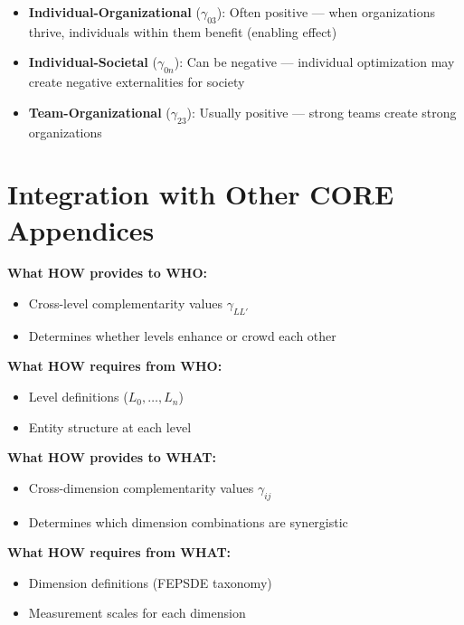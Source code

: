 \begin{itemize}
\item \textbf{Individual-Organizational} ($\gamma_{03}$): Often positive --- when
      organizations thrive, individuals within them benefit (enabling effect)
\item \textbf{Individual-Societal} ($\gamma_{0n}$): Can be negative --- individual
      optimization may create negative externalities for society
\item \textbf{Team-Organizational} ($\gamma_{23}$): Usually positive --- strong
      teams create strong organizations
\end{itemize}


\section{Integration with Other CORE Appendices}
\label{sec:how-integration}

\begin{tcolorbox}[colback=yellow!5!white, colframe=yellow!75!black,
    title=Integration: CORE-HOW $\leftrightarrow$ CORE-WHO]
\textbf{What HOW provides to WHO:}
\begin{itemize}[nosep]
\item Cross-level complementarity values $\gamma_{LL'}$
\item Determines whether levels enhance or crowd each other
\end{itemize}

\textbf{What HOW requires from WHO:}
\begin{itemize}[nosep]
\item Level definitions ($L_0, \ldots, L_n$)
\item Entity structure at each level
\end{itemize}
\end{tcolorbox}

\begin{tcolorbox}[colback=yellow!5!white, colframe=yellow!75!black,
    title=Integration: CORE-HOW $\leftrightarrow$ CORE-WHAT]
\textbf{What HOW provides to WHAT:}
\begin{itemize}[nosep]
\item Cross-dimension complementarity values $\gamma_{ij}$
\item Determines which dimension combinations are synergistic
\end{itemize}

\textbf{What HOW requires from WHAT:}
\begin{itemize}[nosep]
\item Dimension definitions (FEPSDE taxonomy)
\item Measurement scales for each dimension
\end{itemize}
\end{tcolorbox}

